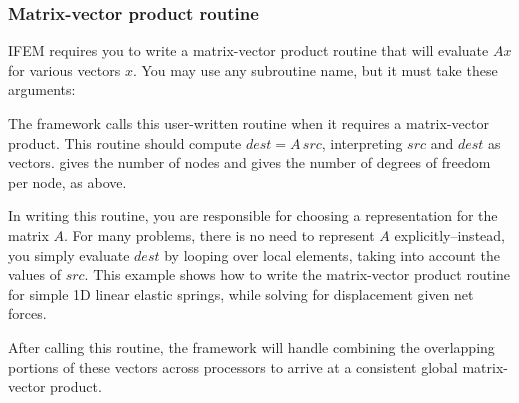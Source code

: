 \documentclass[10pt]{article}
\begin{document}
\newpage
\subsubsection{Matrix-vector product routine}
\label{sec:mvp}

IFEM requires you to write a matrix-vector product routine that will evaluate $A x$ for various vectors $x$.  You may use any subroutine name, but it must take these arguments:


The framework calls this user-written routine when it requires a matrix-vector product.  This routine should compute $dest = A \, src$, interpreting $src$ and $dest$ as vectors.   gives the number of nodes and  gives the number of degrees of freedom per node, as above.

In writing this routine, you are responsible for choosing a representation for the matrix $A$. For many problems, there is no need to represent $A$ explicitly--instead, you simply evaluate $dest$ by looping over local elements, taking into account the values of $src$.  This example shows how to write the matrix-vector product routine for simple 1D linear elastic springs, while solving for displacement given net forces.

After calling this routine, the framework will handle combining the overlapping portions of these vectors across processors to arrive at a consistent global matrix-vector product.
\end{document}
